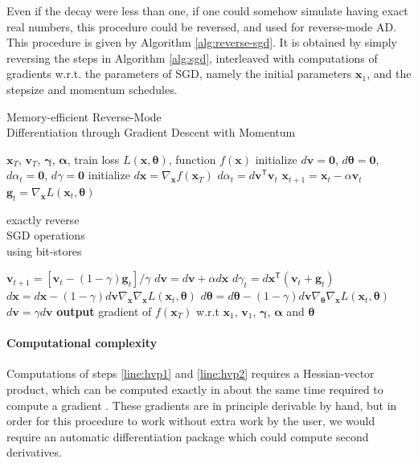 \documentclass{article}
\newcommand{\vx}{\mathbf{x}}
\newcommand{\vv}{\mathbf{v}}
\newcommand{\vg}{\mathbf{g}}
\newcommand{\vzero}{\mathbf{0}}
\newcommand{\tra}{^{\mathsf{T}}}
\newcommand{\hypers}{{\boldsymbol{\theta}}}
\newcommand{\params}{\vx}
\newcommand{\decay}{\gamma}
\newcommand{\decays}{{\boldsymbol{\decay}}}
\newcommand{\stepsize}{\alpha}
\newcommand{\stepsizes}{{\boldsymbol{\stepsize}}}
\newcommand{\gradparamst}{\nabla_\params L(\params_t, \hypers)}
\begin{document}
Even if the decay were less than one, if one could somehow simulate having exact real numbers, this procedure could be reversed, and used for reverse-mode AD.
This procedure is given by Algorithm \ref{alg:reverse-sgd}.
It is obtained by simply reversing the steps in Algorithm \ref{alg:sgd}, interleaved with computations of gradients w.r.t. the parameters of SGD, namely the initial parameters $\vx_1$, and the stepsize and momentum schedules.
%
\begin{algorithm}
   \caption{Memory-efficient Reverse-Mode \\ Differentiation through Gradient Descent with Momentum}
   \label{alg:reverse-sgd}
\begin{algorithmic}[1]
    $\vx_T$, $\vv_T$, $\decays$, $\stepsizes$, train loss $L(\params, \hypers)$, function $f(\params)$
   \State initialize $d\vv = \vzero$, $d\hypers = \vzero$, $d\stepsize_t = \vzero$, $d\decay = \vzero$
   \State initialize $d\vx = \nabla_\params f(\params_T)$
   \State $d\stepsize_t = d\vv\tra \vv_t$
   \State $\vx_{t+1} = \vx_t - \stepsize \vv_t$
   \vspace{-0.95\baselineskip}
   \State $\vg_t = \gradparamst$
   \hfill \scalebox{1.1}{\Bigg\}} \vspace{-\baselineskip} \begin{minipage}{2.5cm} exactly reverse \\ SGD operations \\ using bit-stores \strut \end{minipage}
   \State $\vv_{t+1} = [\vv_t - (1 - \decay) \vg_t] / \decay$
   \State $d\vv = d\vv + \stepsize d\vx$
   \State $d\decay_t = d\vx\tra (\vv_t + \vg_t)$
   \State $d\vx = d\vx - (1 - \decay) d\vv \nabla_\params \gradparamst$ \label{line:hvp1}
   \State $d\hypers = d\hypers - (1 - \decay) d\vv \nabla_\hypers \gradparamst$ \label{line:hvp2}
   \State $d\vv = \decay d\vv$
   \EndFor
   \State \textbf{output} gradient of $f(\vx_T)$ w.r.t $\vx_1$, $\vv_1$, $\decays$, $\stepsizes$ and $\hypers$
\end{algorithmic}
\end{algorithm}
%

\paragraph{Computational complexity}
Computations of steps \ref{line:hvp1} and \ref{line:hvp2} requires a Hessian-vector product, which can be computed exactly in about the same time required to compute a gradient \citep{pearlmutter1994fast}.
These gradients are in principle derivable by hand, but in order for this procedure to work without extra work by the user, we would require an automatic differentiation package which could compute second derivatives.
\end{document}
